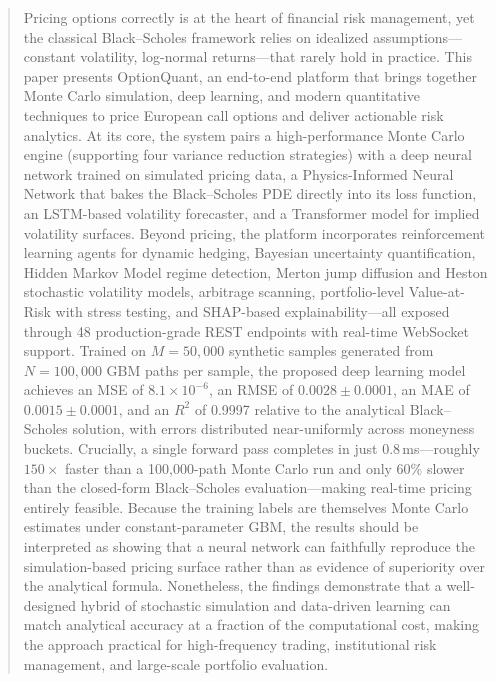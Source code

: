 \documentclass[conference]{IEEEtran}
\begin{document}
\begin{abstract}
Pricing options correctly is at the heart of financial risk management, yet the classical Black--Scholes framework relies on idealized assumptions---constant volatility, log-normal returns---that rarely hold in practice. This paper presents OptionQuant, an end-to-end platform that brings together Monte Carlo simulation, deep learning, and modern quantitative techniques to price European call options and deliver actionable risk analytics. At its core, the system pairs a high-performance Monte Carlo engine (supporting four variance reduction strategies) with a deep neural network trained on simulated pricing data, a Physics-Informed Neural Network that bakes the Black--Scholes PDE directly into its loss function, an LSTM-based volatility forecaster, and a Transformer model for implied volatility surfaces. Beyond pricing, the platform incorporates reinforcement learning agents for dynamic hedging, Bayesian uncertainty quantification, Hidden Markov Model regime detection, Merton jump diffusion and Heston stochastic volatility models, arbitrage scanning, portfolio-level Value-at-Risk with stress testing, and SHAP-based explainability---all exposed through 48 production-grade REST endpoints with real-time WebSocket support. Trained on $M = 50{,}000$ synthetic samples generated from $N = 100{,}000$ GBM paths per sample, the proposed deep learning model achieves an MSE of $8.1 \times 10^{-6}$, an RMSE of $0.0028 \pm 0.0001$, an MAE of $0.0015 \pm 0.0001$, and an $R^2$ of 0.9997 relative to the analytical Black--Scholes solution, with errors distributed near-uniformly across moneyness buckets. Crucially, a single forward pass completes in just 0.8\,ms---roughly $150\times$ faster than a 100{,}000-path Monte Carlo run and only 60\% slower than the closed-form Black--Scholes evaluation---making real-time pricing entirely feasible. Because the training labels are themselves Monte Carlo estimates under constant-parameter GBM, the results should be interpreted as showing that a neural network can faithfully reproduce the simulation-based pricing surface rather than as evidence of superiority over the analytical formula. Nonetheless, the findings demonstrate that a well-designed hybrid of stochastic simulation and data-driven learning can match analytical accuracy at a fraction of the computational cost, making the approach practical for high-frequency trading, institutional risk management, and large-scale portfolio evaluation.
\end{abstract}
\end{document}
